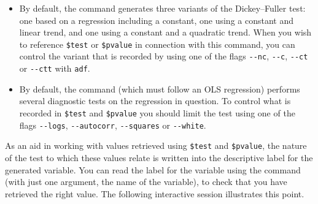 \begin{itemize}
\item By default, the  command generates three variants of
  the Dickey--Fuller test: one based on a regression including a
  constant, one using a constant and linear trend, and one using a
  constant and a quadratic trend.  When you wish to reference
  \verb+$test+ or \verb+$pvalue+ in connection with this command, you
  can control the variant that is recorded by using one of the flags
  \verb+--nc+, \verb+--c+, \verb+--ct+ or \verb+--ctt+ with
  \verb+adf+.
\item By default, the  command (which must follow an OLS
  regression) performs several diagnostic tests on the regression in
  question.  To control what is recorded in \verb+$test+ and
  \verb+$pvalue+ you should limit the test using one of the flags
  \verb+--logs+, \verb+--autocorr+, \verb+--squares+ or
  \verb+--white+.
\end{itemize}

As an aid in working with values retrieved using \verb+$test+ and
\verb+$pvalue+, the nature of the test to which these values relate is
written into the descriptive label for the generated variable.  You
can read the label for the variable using the  command
(with just one argument, the name of the variable), to check that you
have retrieved the right value.  The following interactive session
illustrates this point.





